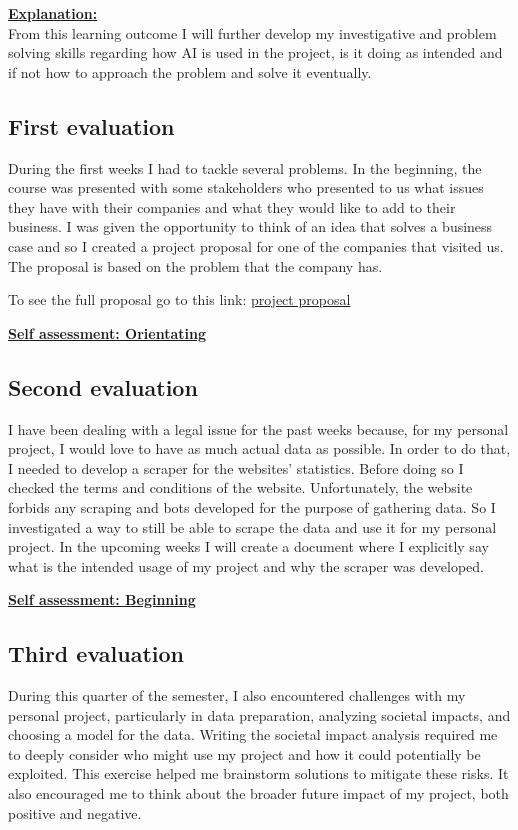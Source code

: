 \documentclass{article}
\begin{document}
	\underline{\textbf{Explanation:}}\\
	From this learning outcome I will further develop my investigative and problem solving skills regarding 
	how AI is used in the project, is it doing as intended and if not how to approach the problem and solve it 
	eventually.
	
	\subsection{First evaluation}
	During the first weeks I had to tackle several problems. In the beginning, the course was presented with some stakeholders 
	who presented to us what issues they have with their companies and what they would like to add to their business. I was given 
	the opportunity to think of an idea that solves a business case and so I created a project proposal for one of the companies that visited us. 
	The proposal is based on the problem that the company has.
	
	To see the full proposal go to this link: \href{https://github.com/BurovDanil/MinorAI/blob/main/Documents/Project%20Proposal/Proposal.md}{project proposal}
	
	\underline{\textbf{Self assessment: Orientating}}
	
	\subsection{Second evaluation}
	I have been dealing with a legal issue for the past weeks because, for my personal project, I would love to have as much actual data as possible. 
	In order to do that, I needed to develop a scraper for the websites' statistics. Before doing so I checked the terms and conditions of the website. 
	Unfortunately, the website forbids any scraping and bots developed for the purpose of gathering data. So I investigated a way to still be able 
	to scrape the data and use it for my personal project. In the upcoming weeks I will create a document where I explicitly say what is the intended usage of 
	my project and why the scraper was developed.
	
	\underline{\textbf{Self assessment: Beginning}}
	
	\subsection{Third evaluation}
	During this quarter of the semester, I also encountered challenges with my personal project, particularly in data preparation, analyzing societal impacts, and choosing a model for the data. Writing the societal impact analysis required me to deeply consider who might use my project and how it could potentially be exploited. This exercise helped me brainstorm solutions to mitigate these risks. It also encouraged me to think about the broader future impact of my project, both positive and negative.\\
	
\end{document}
